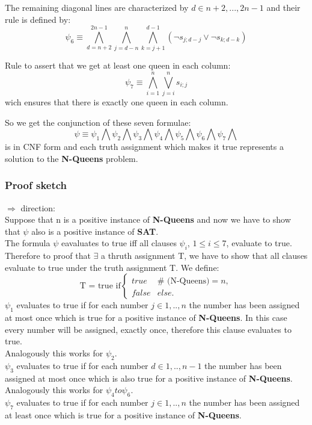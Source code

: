 \noindent The remaining diagonal lines are characterized by $d \in {n+2,...,2n-1}$ and their rule is defined by:
$$\psi_6 \equiv \bigwedge_{d=n+2}^{2n-1}\bigwedge_{j=d-n}^{n}\bigwedge_{k=j+1}^{d-1}(\neg s_{j;d-j} \vee \neg s_{k;d-k})$$

\noindent Rule to assert that we get at least one queen in each column:
$$\psi_7 \equiv \bigwedge_{i=1}^{n}\bigvee_{j=i}^{n}s_{i;j}$$
wich ensures that there is exactly one queen in each column.

\noindent So we get the conjunction of these seven formulae:
$$\psi \equiv \psi_1\bigwedge\psi_2\bigwedge\psi_3\bigwedge\psi_4\bigwedge\psi_5\bigwedge\psi_6\bigwedge\psi_7\bigwedge$$
is in CNF form and each truth assignment which makes it true represents a solution to the \textbf{N-Queens} problem.

\subsubsection{Proof sketch}

$\Rightarrow$ direction:\\
Suppose that n is a positive instance of \textbf{N-Queens} and now we have to show that
$\psi$ also is a positive instance of \textbf{SAT}.\\
The formula $\psi$ eavaluates to true iff all clauses $\psi_i$, $1 \leq i \leq 7$, evaluate to true. 
Therefore to proof that $\exists$ a thruth assignment T, we have to show that all clauses
evaluate to true under the truth assignment T. We define:\\
$$\text{T = true if} 
\left\{ 
\begin{array}{cl}
true & \# \text{ (N-Queens)} = n, \\ 
false & else.
\end{array}%
\right. $$
$\psi_1$ evaluates to true if for each number $j \in {1,..,n}$ the number 
has been assigned at most once which is true for a positive instance of \textbf{N-Queens}.
In this case every number will be assigned, exactly once, therefore this clause evaluates
to true.\\
Analogously this works for $\psi_2$.\\
$\psi_3$ evaluates to true if for each number $d \in {1,..,n-1}$ the number 
has been assigned at most once which is also true for a positive instance of \textbf{N-Queens}.\\
Analogously this works for $\psi_4 to \psi_6$.\\
$\psi_7$ evaluates to true if for each number $j \in {1,..,n}$ the number 
has been assigned at least once which is true for a positive instance of \textbf{N-Queens}.\\

